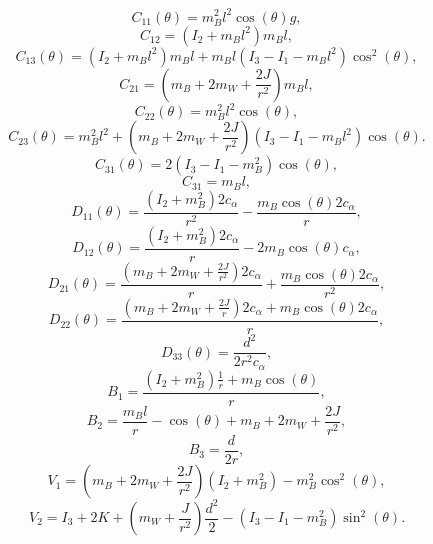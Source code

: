 	\begin{equation}
		C_{11}(\theta) = m_B^2 l^2 \cos(\theta)g,
	\end{equation}
	\begin{equation}
		C_{12} = (I_2 + m_B l^2) m_B l,
	\end{equation}
	\begin{equation}
		C_{13}(\theta) = (I_2 + m_B l^2) m_B l + m_B l (I_3 - I_1 - m_B l^2) \cos^2(\theta),
	\end{equation}
	\begin{equation}
		C_{21} = (m_B + 2m_W + \frac{2J}{r^2}) m_B l,
	\end{equation}
	\begin{equation}
		C_{22}(\theta) = m_B^2 l^2 \cos(\theta),
	\end{equation}
	\begin{equation}
		C_{23}(\theta) = m_B^2 l^2 + (m_B + 2m_W + \frac{2J}{r^2}) (I_3 - I_1 - m_B l^2) \cos(\theta).
	\end{equation}
	\begin{equation}
		C_{31}(\theta) = 2 (I_3 - I_1 - m_B^2) \cos(\theta),
	\end{equation}
	\begin{equation}
		C_{31} = m_B l,
	\end{equation}
	\begin{equation}
		D_{11}(\theta) = \frac{(I_2 + m_B^2) 2c_\alpha}{r^2} - \frac{m_B \cos(\theta) 2c_\alpha}{r},
	\end{equation}
	\begin{equation}
		D_{12}(\theta) = \frac{(I_2 + m_B^2) 2c_\alpha}{r} - 2m_B \cos(\theta) c_\alpha,
	\end{equation}
	\begin{equation}
		D_{21}(\theta) = \frac{(m_B + 2m_W + \frac{2J}{r^2}) 2c_\alpha}{r} + \frac{m_B \cos(\theta) 2c_\alpha}{r^2},
	\end{equation}
	\begin{equation}
		D_{22}(\theta) = \frac{(m_B + 2m_W + \frac{2J}{r}) 2c_\alpha + m_B \cos(\theta) 2c_\alpha}{r},
	\end{equation}
	\begin{equation}
		D_{33}(\theta) = \frac{d^2}{2r^2 c_\alpha},
	\end{equation}
	\begin{equation}
		B_{1} = \frac{(I_2 + m_B^2) \frac{1}{r} + m_B \cos(\theta)}{r},
	\end{equation}
	\begin{equation}
		B_{2} = \frac{m_B l}{r} - \cos(\theta) + m_B + 2m_W + \frac{2J}{r^2},
	\end{equation}
	\begin{equation}
		B_{3} = \frac{d}{2r},
	\end{equation}
	\begin{equation}
		V_{1} = (m_B + 2m_W + \frac{2J}{r^2}) (I_2 + m_B^2) - m_B^2 \cos^2(\theta),
	\end{equation}
	\begin{equation}
		V_{2} = I_3 + 2K + (m_W + \frac{J}{r^2}) \frac{d^2}{2} - (I_3 - I_1 - m_B^2) \sin^2(\theta).
	\end{equation}


